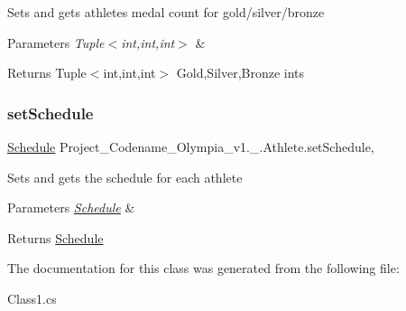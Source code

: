 Sets and gets athlete\textquotesingle{}s medal count for gold/silver/bronze 
\begin{DoxyParams}{Parameters}
{\em Tuple$<$int,int,int$>$} & \\
\hline
\end{DoxyParams}
\begin{DoxyReturn}{Returns}
Tuple$<$int,int,int$>$ Gold,Silver,Bronze ints 
\end{DoxyReturn}
\mbox{\label{classProject__Codename__Olympia__v1_1_1__0_1_1Athlete_ac869bba03b1e1fc2a7adb1f6d13ff868}} 
\subsubsection{\texorpdfstring{set\+Schedule}{setSchedule}}
{\footnotesize\ttfamily \hyperlink{classProject__Codename__Olympia__v1_1_1__0_1_1Schedule}{Schedule} Project\+\_\+\+Codename\+\_\+\+Olympia\+\_\+v1.\+\_.\+Athlete.\+set\+Schedule\hspace{0.3cm}{\ttfamily [get]}, {\ttfamily [set]}}

Sets and gets the schedule for each athlete 
\begin{DoxyParams}{Parameters}
{\em \hyperlink{classProject__Codename__Olympia__v1_1_1__0_1_1Schedule}{Schedule}} & \\
\hline
\end{DoxyParams}
\begin{DoxyReturn}{Returns}
\hyperlink{classProject__Codename__Olympia__v1_1_1__0_1_1Schedule}{Schedule} 
\end{DoxyReturn}


The documentation for this class was generated from the following file\+:\begin{DoxyCompactItemize}
\item 
Class1.\+cs\end{DoxyCompactItemize}
